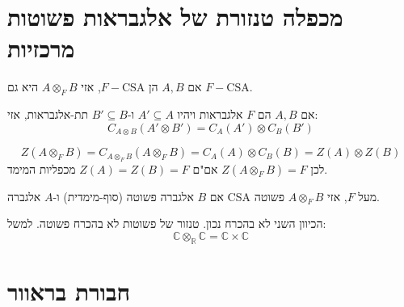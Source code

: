 \documentclass{tstextbook}
\begin{document}
\section{מכפלה טנזורת של אלגבראות פשוטות מרכזיות}

\begin{proposition}
אם \(A, B\) הן \(F-\mathrm{CSA}\), אזי \(A \otimes_{F} B\) היא גם \(F-\mathrm{CSA}\).

\end{proposition}
\begin{lemma}
אם \(A, B\) הם \(F\) אלגבראות ויהיו \(A' \subseteq A\) ו-\(B' \subseteq B\) תת-אלגבראות, אזי:
$$C_{A \otimes B}(A' \otimes B') = C_{A}(A') \otimes C_{B}(B')$$

\end{lemma}
\begin{corollary}
$$Z(A \otimes_{F} B) \!=\! C_{A \otimes_{F} B}(A \otimes_{F} B) \!=\! C_{A}(A) \otimes C_{B}(B) \!=\! Z(A) \otimes Z(B)$$
לכן \(Z(A \otimes_{F} B) = F\) אם"ם \(Z(A) = Z(B) = F\) מכפליות המימד.

\end{corollary}
\begin{lemma}
אם \(B\) אלגברה פשוטה (סוף-מימדית) ו-\(A\) אלגברה CSA מעל \(F\), אזי \(A \otimes_{F} B\) פשוטה.

\end{lemma}
\begin{remark}
הכיוון השני לא בהכרח נכון. טנזור של פשוטות לא בהכרח פשוטה. למשל:
$$\mathbb{C} \otimes_{\mathbb{R}} \mathbb{C} = \mathbb{C} \times \mathbb{C}$$

\end{remark}
\section{חבורת בראוור}
\end{document}
